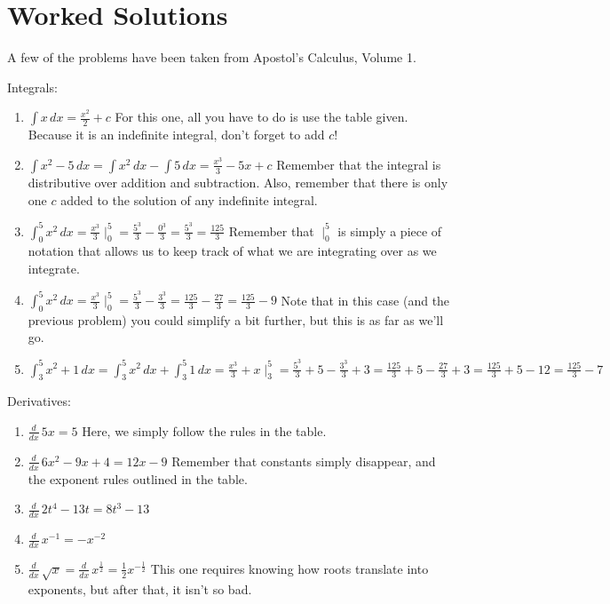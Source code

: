\documentclass[12pt]{article}
\begin{document}
\section{Worked Solutions}

A few of the problems have been taken from Apostol's Calculus, Volume 1.

Integrals: 
\begin{enumerate}
\item $\int x \, dx = \frac{x^2}{2}+c$ For this one, all you have to do is use the table given. 
Because it is an indefinite integral, don't forget to add $c$!
\item $\int x^2 - 5 \,dx = \int x^2 \, dx - \int 5 \, dx = \frac{x^3}{3}-5x + c$ Remember that the integral is distributive over addition and subtraction. 
Also, remember that there is only one $c$ added to the solution of any indefinite integral.
\item $\int^5_0 x^2 \, dx = \frac{x^3}{3}\mid^5_0 = \frac{5^3}{3}-\frac{0^3}{3}=\frac{5^3}{3}=\frac{125}{3}$ Remember that $\mid^5_0$ is simply a piece of notation that allows us to keep track of what we are integrating over as we integrate.
\item $\int^5_0 x^2 \, dx = \frac{x^3}{3}\mid^5_0 = \frac{5^3}{3}-\frac{3^3}{3} = \frac{125}{3} - \frac{27}{3} = \frac{125}{3}-9$ Note that in this case (and the previous problem) you could simplify a bit further, but this is as far as we'll go.
\item $\int^5_3 x^2 + 1\, dx = \int^5_3 x^2 \, dx + \int^5_3 1 \, dx = \frac{x^3}{3}+x\mid^5_3 = \frac{5^3}{3}+5 - \frac{3^3}{3}+3 = \frac{125}{3}+5 - \frac{27}{3}+3 = \frac{125}{3}+5 - 12 = \frac{125}{3}-7$
\end{enumerate}

Derivatives:
\begin{enumerate}
\item $\frac{d}{dx} \, 5x = 5$ Here, we simply follow the rules in the table.
\item $\frac{d}{dx} \, 6x^2 - 9x + 4 = 12x - 9$ Remember that constants simply disappear, and the exponent rules outlined in the table.
\item $\frac{d}{dx} \, 2t^4 - 13t = 8t^3 - 13$
\item $\frac{d}{dx}\, x^{-1} = -x^{-2}$ 
\item $\frac{d}{dx}\, \sqrt{x} = \frac{d}{dx}\, x^{\frac{1}{2}} = \frac{1}{2}x^{-\frac{1}{2}}$ This one requires knowing how roots translate into exponents, but after that, it isn't so bad.
\end{enumerate}
\end{document}

